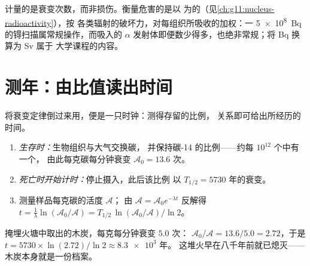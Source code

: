 \begin{remark}[贝可勒尔不等于危害]\label{rem:g12:radioactive-decay:dose}
计量的是衰变次数，而非损伤。衡量危害的是以
为的（见\cref{ch:g11:nucleus-radioactivity}），按
各类辐射的破坏力，对每组织所吸收的加权：一
\qty{5e8}{Bq} 的锝扫描属常规操作，而吸入的
$\alpha$ 发射体即便数少得多，也绝非常规；将 \unit{Bq} 换算为 \unit{Sv} 属于
大学课程的内容。
\end{remark}

\section{测年：由比值读出时间}

将衰变定律倒过来用，便是一只时钟：测得存留的比例，
关系即可给出所经历的时间。

\begin{method}[放射性碳测年法]\label{met:g12:radioactive-decay:carbon}
\begin{enumerate}
  \item \emph{生存时：}生物组织与大气交换碳，
        并保持碳-14 的比例——约每 $10^{12}$ 个中有一个，
        由此每克碳每分钟衰变 $\mathcal A_0 = 13.6$ 次。
  \item \emph{死亡时开始计时：}停止摄入，此后该比例
        以 $T_{1/2} = \num{5730}$ 年的衰变。
  \item 测量样品每克碳的活度 $\mathcal A$；
        由 $\mathcal A = \mathcal A_0 e^{-\lambda t}$ 反解得
        $t = \frac{1}{\lambda}\ln(\mathcal A_0/\mathcal A)
        = T_{1/2}\,\ln(\mathcal A_0/\mathcal A)/\ln 2$。
\end{enumerate}
\end{method}

\begin{example}[洞穴中的一处火塘]\label{ex:g12:radioactive-decay:hearth}
掩埋火塘中取出的木炭，每克每分钟衰变 $5.0$ 次：
$\mathcal A_0/\mathcal A = 13.6/5.0 = 2.72$，于是
$t = \num{5730} \times \ln(2.72)/\ln 2 \approx \num{8.3e3}$ 年。
这堆火早在八千年前就已熄灭——木炭本身就是一份档案。
\end{example}

